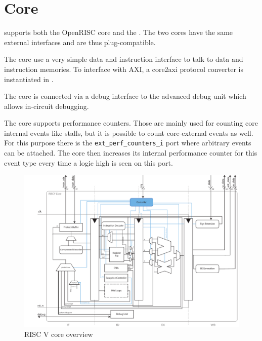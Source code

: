 \chapter{Core}

\pulpino supports both the OpenRISC \orion core and the \riscv \rvcore. The two
cores have the same external interfaces and are thus plug-compatible.

The core use a very simple data and instruction interface to talk to data and
instruction memories. To interface with AXI, a core2axi protocol converter is
instantiated in \pulpino.

The core is connected via a debug interface to the advanced debug unit which
allows in-circuit debugging.

The core supports performance counters. Those are mainly used for counting core
internal events like stalls, but it is possible to count core-external events
as well. For this purpose there is the \texttt{ext\_perf\_counters\_i} port where
arbitrary events can be attached. The core then increases its internal
performance counter for this event type every time a logic high is seen on this
port.

\begin{figure}[ht]
	\centering
  \includegraphics[width=1.5\textwidth, angle=90]{./figures/riscv_arch}
	\caption{RISC V core overview}
	\label{fig1}
\end{figure}